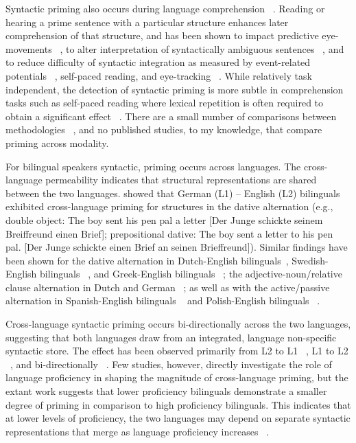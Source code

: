 Syntactic priming also occurs during language comprehension ~\citep{Arai2007, Branigan2005, Ledoux2007, Noppeney2004, Traxler2008, Thothathiri2008}. Reading or hearing a prime sentence with a particular structure enhances later comprehension of that structure, and has been shown to impact predictive eye-movements ~\citep{Arai2007, Thothathiri2008, Traxler2008}, to alter interpretation of syntactically ambiguous sentences ~\citep{Branigan2005}, and to reduce difficulty of syntactic integration as measured by event-related potentials ~\citep{Ledoux2007}, self-paced reading, and eye-tracking ~\citep{Traxler2008}. While relatively task independent, the detection of syntactic priming is more subtle in comprehension tasks such as self-paced reading where lexical repetition is often required to obtain a significant effect ~\citep[e.g., ][]{Ledoux2007, Thothathiri2008}. There are a small number of comparisons between methodologies ~\citep[see e.g., ][]{Chen2013, Tooley2009}, and no published studies, to my knowledge, that compare priming across modality. 

For bilingual speakers syntactic, priming occurs across languages. The cross-language permeability indicates that structural representations are shared between the two languages.  \citet{Loebell2003} showed that German (L1) -- English (L2) bilinguals exhibited cross-language priming for structures in the dative alternation (e.g., double object: The boy sent his pen pal a letter [Der Junge schickte seinem Breiffreund einen Brief]; prepositional dative: The boy sent a letter to his pen pal. [Der Junge schickte einen Brief an seinen Brieffreund]). Similar findings have been shown for the dative alternation in Dutch-English bilinguals~\citep{Schoonbaert2007}, Swedish-English bilinguals ~\citep{Kantola2011}, and Greek-English bilinguals ~\citep{Salamoura2007}; the adjective-noun\slash relative clause alternation in Dutch and German ~\citep{Bernolet2007}; as well as with the active\slash passive alternation in Spanish-English bilinguals ~\citep{Hartsuiker2004} and Polish-English bilinguals ~\citep{Fleischer2012}. 

Cross-language syntactic priming occurs bi-directionally across the two languages, suggesting that both languages draw from an integrated, language non-specific syntactic store. The effect has been observed primarily from L2 to L1 ~\citep{Desmet2006, Hartsuiker2004, Meijer2003, Salamoura2007}, L1 to L2 ~\citep[e.g.,][]{Bernolet2013}, and bi-directionally ~\citep{Bernolet2007, Kantola2011, Loebell2003, Schoonbaert2007, Shin2009, Weber2009}. Few studies, however, directly investigate the role of language proficiency in shaping the magnitude of cross-language priming, but the extant work suggests that lower proficiency bilinguals demonstrate a smaller degree of priming in comparison to high proficiency bilinguals. This indicates that at lower levels of proficiency, the two languages may depend on separate syntactic representations that merge as language proficiency increases ~\citep{Bernolet2013}. 

